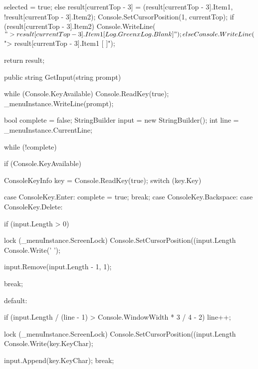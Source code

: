 \begin{flushleft}
\begin{cscode}
{{{{{                    selected = true;
                }
                else
                {
                    result[currentTop - 3] = (result[currentTop - 3].Item1, !result[currentTop - 3].Item2);
                    Console.SetCursorPosition(1, currentTop);
                    if (result[currentTop - 3].Item2) Console.WriteLine($"> {result[currentTop - 3].Item1} [{Log.Green}x{Log.Blank}]");
                    else Console.WriteLine($"> {result[currentTop - 3].Item1} [ ]");
                }
            }
        }

        return result;
    }


    public string GetInput(string prompt)
    {
        while (Console.KeyAvailable) Console.ReadKey(true);
        _menuInstance.WriteLine(prompt);

        bool complete = false;
        StringBuilder input = new StringBuilder();
        int line = _menuInstance.CurrentLine;

        while (!complete)
        {
            if (Console.KeyAvailable)
            {
                ConsoleKeyInfo key = Console.ReadKey(true);
                switch (key.Key)
                {
                    case ConsoleKey.Enter:
                        complete = true;
                        break;
                    case ConsoleKey.Backspace:
                    case ConsoleKey.Delete:
                        {
                            if (input.Length > 0)
                            {
                                lock (_menuInstance.ScreenLock)
                                {
                                    Console.SetCursorPosition((input.Length %
                                    Console.Write(' ');
                                }

                                input.Remove(input.Length - 1, 1);
                            }

                            break;
                        }
                    default:
                        {
                            if (input.Length / (line - 1) > Console.WindowWidth * 3 / 4 - 2) line++;

                            lock (_menuInstance.ScreenLock)
                            {
                                Console.SetCursorPosition((input.Length %
                                Console.Write(key.KeyChar);
                            }

                            input.Append(key.KeyChar);
                            break;
                        }
                }
            }
        }

}}
\end{cscode}
\end{flushleft}
